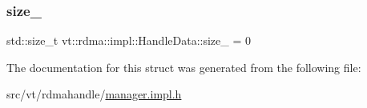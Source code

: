 \subsubsection{\texorpdfstring{size\+\_\+}{size\_}}
{\footnotesize\ttfamily std\+::size\+\_\+t vt\+::rdma\+::impl\+::\+Handle\+Data\+::size\+\_\+ = 0}



The documentation for this struct was generated from the following file\+:\begin{DoxyCompactItemize}
\item 
src/vt/rdmahandle/\hyperlink{rdmahandle_2manager_8impl_8h}{manager.\+impl.\+h}\end{DoxyCompactItemize}
